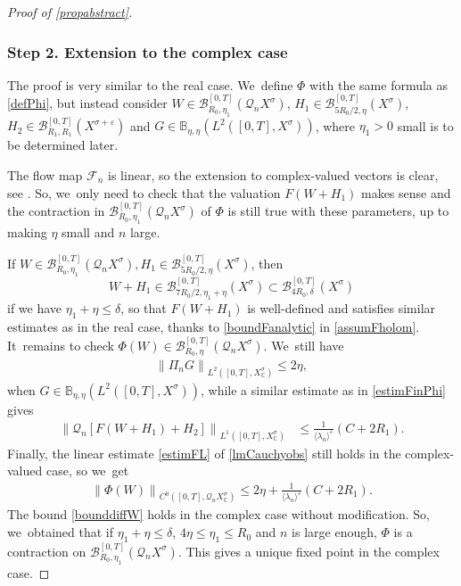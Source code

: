 \documentclass[10pt]{amsart}
\theoremstyle{definition}
\let\mc\mathcal
\let\veps\varepsilon
\newcommand{\B}{\mc{B}}
\newcommand{\Q}{\mathcal{Q}}
\providecommand{\inn}[1]{\langle#1\rangle}
\newcommand\nor[2]{\left\|#1\right\|_{#2}}
\newcommand\FL{\mathcal{F}_{n}}
\begin{document}
\begin{proof}[Proof of \cref{propabstract}]
\subsubsection*{Step 2. Extension to the complex case} The proof is very similar to the real case. We~define $\Phi$ with the same formula as \eqref{defPhi}, but instead consider $W\in \B_{R_{0},\eta_{1}}^{[0,T]}(\Q_n X^{\sigma})$, $H_{1}\in \B_{5R_{0}/2,\eta}^{[0,T]}(X^{\sigma})$, $H_{2}\in \B_{R_{1}, R_{1}}^{[0,T]}(X^{\sigma+\veps})$ and $G\in \mathbb{B}_{\eta,\eta}(L^{2}([0,T],X^{\sigma}))$, where $\eta_{1}>0$ small is to be determined later.

The flow map $\FL$ is linear, so the extension to complex-valued vectors is clear, see \cite[Th.\,3]{BS:71-polynomials}. So, we~only need to check that the valuation $F(W+H_{1})$ makes sense and the contraction in $\B_{R_{0},\eta_{1}}^{[0,T]}(\Q_n X^{\sigma})$ of $\Phi$ is still true with these parameters, up to making $\eta$ small and $n$ large.

If $W\in \B_{R_{0},\eta_{1}}^{[0,T]}(\Q_n X^{\sigma}), H_{1}\in \B_{5R_{0}/2,\eta}^{[0,T]}(X^{\sigma})$, then
\[
W+H_{1}\in \B_{7R_{0}/2,\eta_{1}+\eta}^{[0,T]}(X^{\sigma})\subset \B_{4R_{0},\delta}^{[0,T]}(X^{\sigma})
\]
if we have $\eta_{1}+\eta\leq \delta$, so that $F(W+H_{1})$ is well-defined and satisfies similar estimates as in the real case, thanks to \eqref{boundFanalytic} in \cref{assumFholom}. It~remains to check $\Phi(W)\in \B_{R_{0},\eta}^{[0,T]}(\Q_n X^{\sigma})$. We~still have
\begin{align*}
\nor{\Pi_{n}G}{L^{2}([0,T],X_\mathbb{C}^{\sigma})}\leq 2\eta,
\end{align*}
when $G\in \mathbb{B}_{\eta,\eta}(L^{2}([0,T],X^{\sigma}))$, while a similar estimate as in \eqref{estimFinPhi} gives
\begin{align*}
\nor{\Q_{n}\left[ F(W+H_{1})+H_{2}\right]}{L^{1}([0,T],X_\mathbb{C}^{\sigma})}&\leq \frac{1}{\inn{\lambda_n}^{\veps}} \left(C+2R_{1}\right).
\end{align*}
Finally, the linear estimate \eqref{estimFL} of \cref{lmCauchyobs} still holds in the complex-valued case, so we~get
\begin{align*}
\nor{\Phi(W)}{C^{0}([0,T],\Q_{n}X_\mathbb{C}^{\sigma})}\leq 2\eta+ \frac{1}{\inn{\lambda_n}^{\veps}} \left(C+2R_{1}\right).
\end{align*}
The bound \eqref{bounddiffW} holds in the complex case without modification. So, we~obtained that if $\eta_{1}+\eta\leq \delta$, $4\eta\leq \eta_{1}\leq R_{0}$ and $n$ is large enough, $\Phi$ is a contraction on $\B_{R_{0},\eta_{1}}^{[0,T]}(\Q_n X^{\sigma})$. This gives a unique fixed point in the complex case.


\end{proof}
\end{document}
